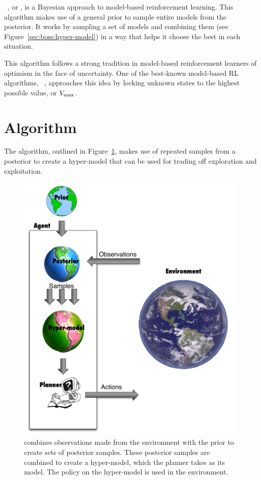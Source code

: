 ~\cite{asmuth09}, or , is a Bayesian approach to model-based reinforcement learning. This algorithm makes use of a general prior to sample entire models from the posterior. It works by sampling a set of models and combining them (see Figure~\ref{sec:boss:hyper-model}) in a way that helps it choose the best in each situation.

This algorithm follows a strong tradition in model-based reinforcement learners of optimism in the face of uncertainty. One of the best-known model-based RL algorithms, ~\cite{brafman03}, approaches this idea by locking unknown states to the highest possible value, or $V_{\rm max}$.

\section{Algorithm}

The  algorithm, outlined in Figure~\ref{boss:fig:boss-general}, makes use of repeated samples from a posterior to create a hyper-model that can be used for trading off exploration and exploitation.


\begin{figure}[t]
\begin{center}
\includegraphics[width=0.75\linewidth]{figures/boss-loop}
\caption{ combines observations made from the environment with the prior to create sets of posterior samples. These posterior samples are combined to create a hyper-model, which the planner takes as its model. The policy on the hyper-model is used in the environment.}
\label{boss:fig:boss-general}
\end{center}
\end{figure}

